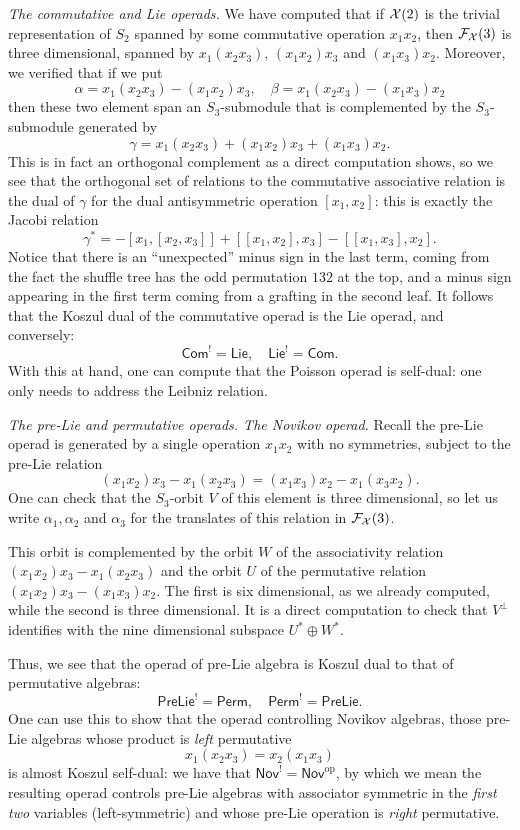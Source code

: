 \emph{The commutative and Lie operads.}
We have computed that if $\mathcal{X}(2)$ is the trivial representation
of $S_2$ spanned by some commutative operation $x_1x_2$,
then $\mathcal{F}_{\mathcal{X}}(3)$ is three dimensional, spanned by
$x_1(x_2x_3)$, $(x_1x_2)x_3$ and $(x_1x_3)x_2$.
Moreover, we verified that if we put
\[ \alpha = x_1(x_2x_3) -(x_1x_2)x_3, 	\quad 
     \beta =  x_1(x_2x_3) -(x_1x_3)x_2 \]
     then these two element span an $S_3$-submodule
     that is complemented by the $S_3$-submodule generated by
     \[ \gamma = x_1(x_2x_3) +(x_1x_2)x_3+  (x_1x_3)x_2.\]
 This is in fact an orthogonal complement as a direct computation
 shows, so we see that the orthogonal set of relations
 to the commutative associative relation is the dual of
 $\gamma$ for the dual antisymmetric operation $[x_1,x_2]$:
 this is exactly the Jacobi relation
 \[ 
 \gamma^* = -[x_1,[x_2,x_3]] +[[x_1,x_2],x_3]-[[x_1,x_3],x_2].
 \]
 Notice that there is an ``unexpected'' minus
 sign in the last term, coming from the fact
 the shuffle tree has the odd permutation $132$
 at the top, and a minus sign appearing in the
 first term coming from a grafting in the second
 leaf.
 It follows that the Koszul dual of the commutative operad is the
 Lie operad, and conversely:
 \[ \mathsf{Com}^! = \mathsf{Lie}, \quad
  \mathsf{Lie}^! = \mathsf{Com}.
  	\]
With this at hand, one can compute that the Poisson operad is self-dual:
one only needs to address the Leibniz relation.  

\bigskip

\emph{The pre-Lie and permutative operads. The Novikov operad.}
Recall the pre-Lie operad is generated by a single operation $x_1x_2$
with no symmetries, subject to the pre-Lie relation
\[(x_1x_2)x_3 - x_1(x_2x_3) = (x_1x_3)x_2 - x_1(x_3x_2). \]
One can check that the $S_3$-orbit $V$ of this element is three dimensional,
so let us write $\alpha_1,\alpha_2$ and $\alpha_3$ for the translates of
this relation in $\mathcal{F}_{\mathcal{X}}(3)$. 

This orbit is complemented by the orbit $W$ of the associativity relation
$(x_1x_2)x_3 - x_1(x_2x_3)$ and the orbit $U$ of the permutative relation
$(x_1x_2)x_3 - (x_1x_3)x_2$. The first is six dimensional, as we already
computed, while the second is three dimensional. It is a direct computation
to check that $V^\perp$ identifies with the nine dimensional subspace 
$U^*\oplus W^*$. 

Thus, we see that the operad of pre-Lie algebra is Koszul dual to that
of permutative algebras:
\[ \mathsf{PreLie}^! = \mathsf{Perm},\quad
 	\mathsf{Perm}^! = \mathsf{PreLie}.\]
One can use this to show that the operad controlling Novikov algebras,
those pre-Lie algebras whose product is \emph{left} permutative
\[ x_1(x_2x_3) = x_2(x_1x_3) \]
is almost Koszul self-dual: we have that $\mathsf{Nov}^! = 
\mathsf{Nov}^{\mathrm{op}}$, by which we mean the resulting
operad controls pre-Lie algebras with associator symmetric
in the \emph{first two} variables (left-symmetric) and 
whose pre-Lie operation is \emph{right} permutative.
